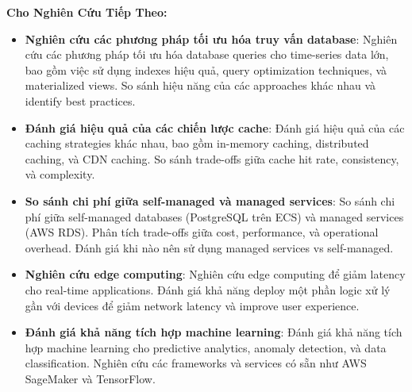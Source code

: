 \textbf{Cho Nghiên Cứu Tiếp Theo:}
\begin{itemize}
    \item \textbf{Nghiên cứu các phương pháp tối ưu hóa truy vấn database}: Nghiên cứu các phương pháp tối ưu hóa database queries cho time-series data lớn, bao gồm việc sử dụng indexes hiệu quả, query optimization techniques, và materialized views. So sánh hiệu năng của các approaches khác nhau và identify best practices.
    
    \item \textbf{Đánh giá hiệu quả của các chiến lược cache}: Đánh giá hiệu quả của các caching strategies khác nhau, bao gồm in-memory caching, distributed caching, và CDN caching. So sánh trade-offs giữa cache hit rate, consistency, và complexity.
    
    \item \textbf{So sánh chi phí giữa self-managed và managed services}: So sánh chi phí giữa self-managed databases (PostgreSQL trên ECS) và managed services (AWS RDS). Phân tích trade-offs giữa cost, performance, và operational overhead. Đánh giá khi nào nên sử dụng managed services vs self-managed.
    
    \item \textbf{Nghiên cứu edge computing}: Nghiên cứu edge computing để giảm latency cho real-time applications. Đánh giá khả năng deploy một phần logic xử lý gần với devices để giảm network latency và improve user experience.
    
    \item \textbf{Đánh giá khả năng tích hợp machine learning}: Đánh giá khả năng tích hợp machine learning cho predictive analytics, anomaly detection, và data classification. Nghiên cứu các frameworks và services có sẵn như AWS SageMaker và TensorFlow.
\end{itemize}

